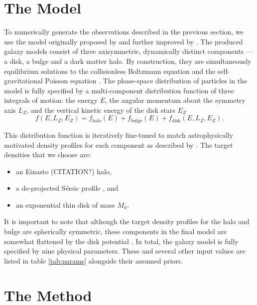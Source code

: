 \documentclass[preprint]{aastex}
\newcommand{\tab}[1]{table \ref{tab:#1}}
\newcommand{\eqlabel}[1]{\label{eq:#1}}
\newcommand{\df}{f}
\newcommand{\dfs}[1]{\df_\mathrm{#1}}
\newcommand{\dfhalo}{\dfs{halo}}
\newcommand{\dfbulge}{\dfs{bulge}}
\newcommand{\dfdisk}{\dfs{disk}}
\newcommand{\E}{\ensuremath{E}}
\newcommand{\Lz}{\ensuremath{L_Z}}
\newcommand{\Ez}{\ensuremath{E_Z}}
\newcommand{\disk}{\mathrm{d}}
\newcommand{\mass}{\ensuremath{M}}
\newcommand{\Md}{\ensuremath{\mass_\disk}}
\begin{document}
\section{The Model}

To numerically generate the observations described in the previous section, we
use the model originally proposed by \citet{Kuijken:1995} and further improved
by \citet{Widrow:2008}.  The produced galaxy models consist of three axisymmetric,
dynamically distinct components --- a disk, a bulge and a dark matter halo.
By construction, they are simultaneously equilibrium solutions to the collisionless
Boltzmann equation and the self-gravitational Poisson equation \citep{Binney:2008}.
The phase-space distribution of particles in the model is fully specified by a
multi-component distribution function of three integrals of motion: the energy
\E, the angular momentum about the symmetry axis \Lz, and the vertical kinetic
energy of the disk stars \Ez
\begin{equation}
    \eqlabel{df1}
    \df (\E,\Lz,\Ez) = \dfhalo (\E) + \dfbulge (\E) + \dfdisk (\E,\Lz,\Ez).
\end{equation}

This distribution function is iteratively fine-tuned to match astrophysically
motivated density profiles for each component as described by \citet{Widrow:2008}.
The target densities that we choose are:
\begin{itemize}
    \item{an Einasto (CITATION?) halo,}
    \item{a de-projected S\'ersic profile \citep{Prugniel:1997,Terzic:2005}, and}
    \item{an exponential thin disk of mass \Md.}
\end{itemize}
It is important to note that although the target density profiles for the halo
and bulge are spherically symmetric, these components in the final model are
somewhat flattened by the disk potential \citep{Widrow:2008}.  In total, the
galaxy model is fully specified by nine physical parameters.  These and several
other input values are listed in \tab{params} alongside their assumed priors.




\section{The Method}
\end{document}
